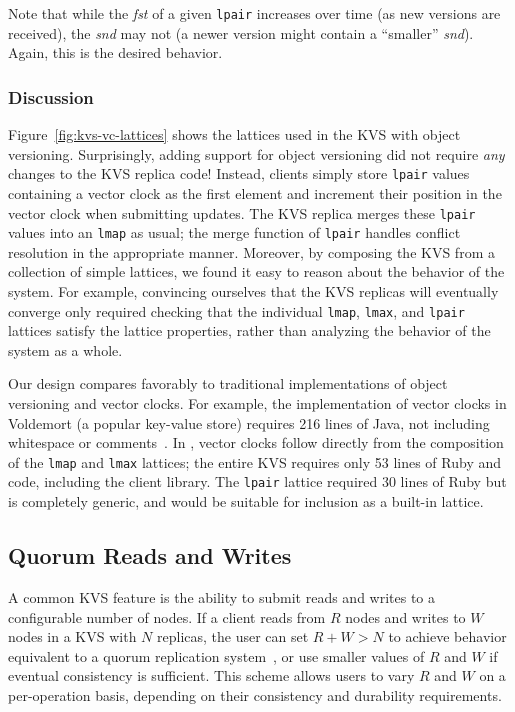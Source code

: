 Note that while the \emph{fst} of a given \texttt{lpair} increases over time (as
new versions are received), the \emph{snd} may not (a newer version might
contain a ``smaller'' \emph{snd}). Again, this is the desired behavior.

\subsubsection{Discussion}
Figure~\ref{fig:kvs-vc-lattices} shows the lattices used in the KVS with object
versioning. Surprisingly, adding support for object versioning did not require
\emph{any} changes to the KVS replica code! Instead, clients simply store
\texttt{lpair} values containing a vector clock as the first element and
increment their position in the vector clock when submitting updates. The KVS
replica merges these \texttt{lpair} values into an \texttt{lmap} as usual; the
merge function of \texttt{lpair} handles conflict resolution in the appropriate
manner. Moreover, by composing the KVS from a collection of simple lattices, we
found it easy to reason about the behavior of the system. For example,
convincing ourselves that the KVS replicas will eventually converge only
required checking that the individual \texttt{lmap}, \texttt{lmax}, and
\texttt{lpair} lattices satisfy the lattice properties, rather than analyzing
the behavior of the system as a whole.

Our design compares favorably to traditional implementations of object
versioning and vector clocks. For example, the implementation of vector clocks
in Voldemort (a popular key-value store) requires 216 lines of Java, not
including whitespace or comments~\cite{voldemort-vector-clock}. In \lang, vector
clocks follow directly from the composition of the \texttt{lmap} and
\texttt{lmax} lattices; the entire KVS requires only 53 lines of Ruby and \lang
code, including the client library. The \texttt{lpair} lattice required 30 lines
of Ruby but is completely generic, and would be suitable for inclusion as a
built-in lattice.

\subsection{Quorum Reads and Writes}
A common KVS feature is the ability to submit reads and writes to a configurable
number of nodes. If a client reads from $R$ nodes and writes to $W$ nodes in a
KVS with $N$ replicas, the user can set $R + W > N$ to achieve behavior
equivalent to a quorum replication system~\cite{Gifford1979}, or use smaller
values of $R$ and $W$ if eventual consistency is sufficient. This scheme allows
users to vary $R$ and $W$ on a per-operation basis, depending on their
consistency and durability requirements.

